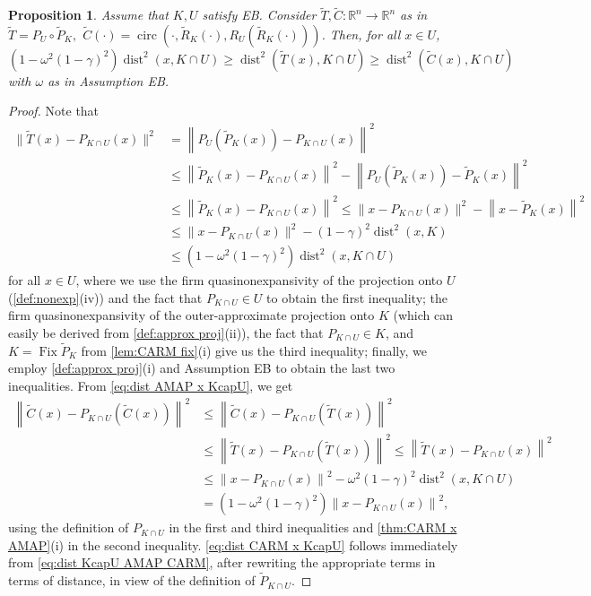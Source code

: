\documentclass[smallextended,numbook,nospthms]{svjour3}
\theoremstyle{plain}
\newtheorem{proposition}[theorem]{Proposition}
\theoremstyle{definition}
\def\RR{\mathds R}
\DeclareMathOperator{\Fix}{Fix}
\DeclareMathOperator{\dist}{dist}
\DeclareMathOperator{\circum}{circ}
\begin{document}
\begin{proposition}\label{prop:EB dist}
	Assume that $K, U$ satisfy EB. Consider $\tilde{T}, \tilde{C}: \RR^{n} \rightarrow \RR^{n}$ as in $\tilde{T}=P_{U} \circ \tilde{P}_{K},$ $\tilde{C}(\cdot)=\circum\left(\cdot, \tilde{R}_{K}(\cdot), R_{U}\left(\tilde{R}_{K}(\cdot)\right)\right)$. Then, for all $x \in U$,
	\begin{equation}\label{eq:dist KcapU AMAP CARM}
		\left(1-\omega^{2}(1-\gamma)^2\right) \dist^{2}(x, K \cap U) \geq \dist^{2}(\tilde{T}(x), K \cap U) \geq \dist^{2}(\tilde{C}(x), K \cap U)
	\end{equation}
	with $\omega$ as in Assumption EB.
\end{proposition}
\begin{proof}
    Note that
	\begin{align}
		\|\tilde{T}(x)-P_{K \cap U}(x)\|^{2} &=\left\|P_{U}\left(\tilde{P}_{K}(x)\right)-P_{K \cap U}(x)\right\|^{2} \\
		&\leq \left\|\tilde{P}_{K}(x)-P_{K \cap U}(x)\right\|^{2}-\left\|P_{U}\left(\tilde{P}_{K}(x)\right)-\tilde{P}_{K}(x)\right\|^{2} \\ &\leq\left\|\tilde{P}_{K}(x)-P_{K \cap U}(x)\right\|^{2} \leq\|x-P_{K \cap U}(x)\|^{2}-\left\|x-\tilde{P}_{K}(x)\right\|^{2} \\
		&\leq \|x-P_{K \cap U}(x)\|^{2}-(1-\gamma)^2\dist^{2}(x, K) \\ &\leq (1-\omega^{2}(1-\gamma)^{2}) \dist^{2}(x, K \cap U) \label{eq:dist AMAP x KcapU}
	\end{align}
	for all $x \in U$,  where we use the firm quasinonexpansivity of the projection onto $U$ (\cref{def:nonexp}(iv)) and the fact that $P_{K \cap U} \in U$ to obtain the first inequality; the
	firm quasinonexpansivity of the outer-approximate projection onto $K$ (which can easily be derived from \cref{def:approx proj}(ii)), the fact that $P_{K \cap U} \in K$, and  $K = \Fix \tilde{P}_{K}$ from \cref{lem:CARM fix}(i) give us the third inequality; finally, we employ \cref{def:approx proj}(i) and Assumption EB to obtain the last two inequalities. From \cref{eq:dist AMAP x KcapU}, we get
	\begin{align}
		\left\|\tilde{C}(x)-P_{K \cap U}(\tilde{C}(x))\right\|^{2} & \leq\left\|\tilde{C}(x)-P_{K \cap U}(\tilde{T}(x))\right\|^{2}  \\
		& \leq\left\|\tilde{T}(x)-P_{K \cap U}(\tilde{T}(x))\right\|^{2} \leq\left\|\tilde{T}(x)-P_{K \cap U}(x)\right\|^{2}  \\
		& \leq\left\|x-P_{K \cap U}(x)\right\|^{2}-\omega^{2}(1-\gamma)^{2} \dist^{2}(x, K \cap U)  \\
		&=\left(1-\omega^{2}(1-\gamma)^{2}\right)\left\|x-P_{K \cap U}(x)\right\|^{2},\label{eq:dist CARM x KcapU}
	\end{align}
	using the definition of $P_{K \cap U}$ in the first and third inequalities and \cref{thm:CARM x AMAP}(i) in the second inequality. \cref{eq:dist CARM x KcapU} follows immediately from \cref{eq:dist KcapU AMAP CARM}, after rewriting the appropriate terms in terms of distance, in view of the definition of $\tilde{P}_{K \cap U}$.
	\end{proof}
\end{document}
